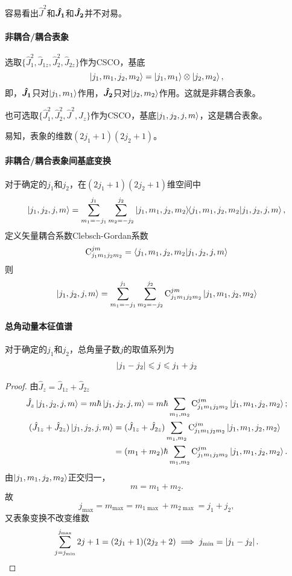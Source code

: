 容易看出$\hat J^2$和$\bm{\hat J_1}\!\mathop{}$和$\bm{\hat J_2}\!\mathop{}$并\accentd 不对易。
\paragraph{非耦合/耦合表象}选取$\{\hat J_1^2,\hat J_{1z},\hat J_2^2,\hat J_{2z}\}$作为CSCO，基底
\[
	\left\vert j_1,m_1,j_2,m_2\right\rangle=\left\vert j_1,m_1\right\rangle\otimes\left\vert j_2,m_2\right\rangle,
\]
即，$\bm{\hat J_1}\!\mathop{}$只对$\left\vert j_1,m_1\right\rangle$作用，$\bm{\hat J_2}\!\mathop{}$只对$\left\vert j_2,m_2\right\rangle$作用。这就是非耦合表象。

也可选取$\{\hat J_1^2,\hat J_2^2,\hat J^2,\hat J_z\}$作为CSCO，基底$\left\vert j_1,j_2,j,m\right\rangle$，这是耦合表象。

易知，表象的维数$(2j_1+1)(2j_2+1)$。
\iffalse
封闭关系
\begin{align*}
	\sum_{m_1=-j_1}^{j_1}\sum_{m_2=-j_2}^{j_2}\ktbr{j_1,m_1,j_2,m_2}{j_1,m_1,j_2,m_2}=I.
\end{align*}
\[
	\sum_{j=j_{\min}}^{j_{\max}}\sum_{m=-j}^j\ktbr{j_1,j_2,j,m}{j_1,j_2,j,m}=I.
\]
\fi

\paragraph{非耦合/耦合表象间基底变换}对于确定的$j_1$和$j_2$，在$(2j_1+1)(2j_2+1)$维空间中
\begin{align*}
	\left\vert j_1,j_2,j,m\right\rangle=\sum_{m_1=-j_1}^{j_1}\sum_{m_2=-j_2}^{j_2}\left\vert j_1,m_1,j_2,m_2\right\rangle\hspace{-3pt}\left\langle j_1,m_1,j_2,m_2\middle\vert j_1,j_2,j,m\right\rangle,
\end{align*}
定义矢量耦合系数Clebsch-Gordan系数
\[
	\operatorname{C}_{j_1m_1j_2m_2}^{jm}=\left\langle j_1,m_1,j_2,m_2\middle\vert j_1,j_2,j,m\right\rangle
\]
则
\begin{align}
	\left\vert j_1,j_2,j,m\right\rangle=\sum_{m_1=-j_1}^{j_1}\sum_{m_2=-j_2}^{j_2}\operatorname{C}_{j_1m_1j_2m_2}^{jm}\left\vert j_1,m_1,j_2,m_2\right\rangle
\end{align}
\paragraph{总角动量本征值谱}对于确定的$j_1$和$j_2$，总角量子数$j$的取值系列为
\begin{align}
	\left\lvert j_1-j_2\right\rvert\leqslant j\leqslant j_1+j_2
\end{align}
\begin{proof}
	由$\hat J_z=\hat J_{1z}+\hat J_{2z}$
	\begin{align*}
		\hat J_z\left\vert j_1,j_2,j,m\right\rangle=m\hbar\left\vert j_1,j_2,j,m\right\rangle=m\hbar\sum_{m_1,m_2}\operatorname{C}_{j_1m_1j_2m_2}^{jm}\left\vert j_1,m_1,j_2,m_2\right\rangle;\\
		\begin{aligned}
			(\hat J_{1z}+\hat J_{2z})\left\vert j_1,j_2,j,m\right\rangle&=(\hat J_{1z}+\hat J_{2z})\sum_{m_1,m_2}\operatorname{C}_{j_1m_1j_2m_2}^{jm}\left\vert j_1,m_1,j_2,m_2\right\rangle\\
			&=(m_1+m_2)\hbar\sum_{m_1,m_2}\operatorname{C}_{j_1m_1j_2m_2}^{jm}\left\vert j_1,m_1,j_2,m_2\right\rangle.
		\end{aligned}
	\end{align*}
	由$\left\vert j_1,m_1,j_2,m_2\right\rangle$正交归一，
	\[
	m=m_1+m_2.
	\]%
	故
	\[
	j_{\max}=m_{\max}=m_{1\max}+m_{2\max}=j_1+j_2,
	\]
	又表象变换不改变维数
	\[
		\sum_{j=j_{\min}}^{j_{\max}}2j+1=(2j_1+1)(2j_2+2)\implies j_{\min}=\left\lvert j_1-j_2\right\rvert.
	\]
\end{proof}
